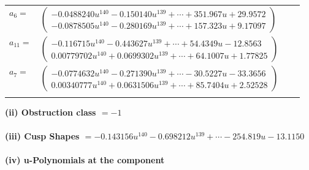 \documentclass[1p]{elsarticle_modified}
\theoremstyle{definition}
\begin{document}
\begin{tabular}{m{7pt} m{180pt} m{7pt} m{180pt} }
\flushright $a_{6}=$&$\begin{pmatrix}-0.0488240 u^{140}-0.150140 u^{139}+\cdots+351.967 u+29.9572\\-0.0878505 u^{140}-0.280169 u^{139}+\cdots+157.323 u+9.17097\end{pmatrix}$ \\
\flushright $a_{11}=$&$\begin{pmatrix}-0.116715 u^{140}-0.443627 u^{139}+\cdots+54.4349 u-12.8563\\0.00779702 u^{140}+0.0699302 u^{139}+\cdots+64.1007 u+1.77825\end{pmatrix}$ \\
\flushright $a_{7}=$&$\begin{pmatrix}-0.0774632 u^{140}-0.271390 u^{139}+\cdots-30.5227 u-33.3656\\0.00340777 u^{140}+0.0631506 u^{139}+\cdots+85.7404 u+2.52528\end{pmatrix}$\\&\end{tabular}
\flushleft \textbf{(ii) Obstruction class $= -1$}\\~\\
\flushleft \textbf{(iii) Cusp Shapes $= -0.143156 u^{140}-0.698212 u^{139}+\cdots-254.819 u-13.1150$}\\~\\
\newpage\renewcommand{\arraystretch}{1}
\flushleft \textbf{(iv) u-Polynomials at the component}\newline \\
\end{document}
